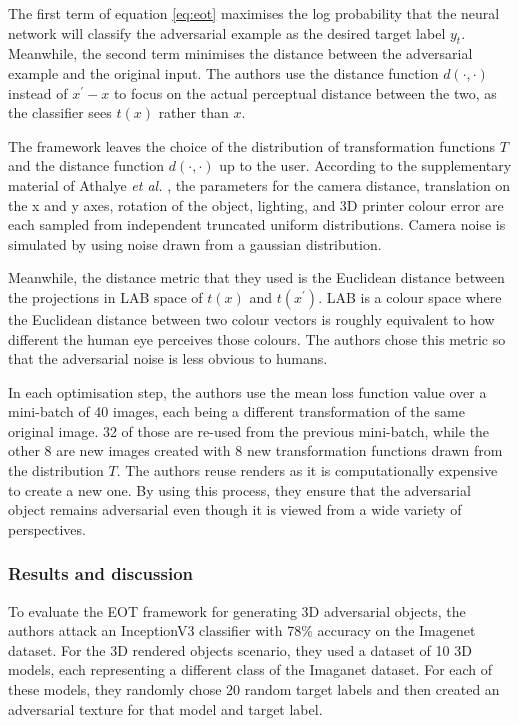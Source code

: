 The first term of equation \ref{eq:eot} maximises the log probability that the neural network will classify the adversarial example as the desired target label $y_{t}$. Meanwhile, the second term minimises the distance between the adversarial example and the original input. The authors use the distance function $d(\cdot, \cdot)$ instead of $x^\prime - x$ to focus on the actual perceptual distance between the two, as the classifier sees $t(x)$ rather than $x$.

The framework leaves the choice of the distribution of transformation functions $T$ and the distance function $d(\cdot, \cdot)$ up to the user. According to the supplementary material of Athalye \textit{et al.} \cite{athalye}, the parameters for the camera distance, translation on the x and y axes, rotation of the object, lighting, and 3D printer colour error are each sampled from independent truncated uniform distributions. Camera noise is simulated by using noise drawn from a gaussian distribution.

Meanwhile, the distance metric that they used is the Euclidean distance between the projections in LAB space of $t(x)$ and $t(x^\prime)$. LAB \cite{lab} is a colour space where the Euclidean distance between two colour vectors is roughly equivalent to how different the human eye perceives those colours. The authors chose this metric so that the adversarial noise is less obvious to humans. 

In each optimisation step, the authors use the mean loss function value over a mini-batch of 40 images, each being a different transformation of the same original image. 32 of those are re-used from the previous mini-batch, while the other 8 are new images created with 8 new transformation functions drawn from the distribution $T$. The authors reuse renders as it is computationally expensive to create a new one. By using this process, they ensure that the adversarial object remains adversarial even though it is viewed from a wide variety of perspectives.

\subsubsection{Results and discussion}
    \label{subsubsec:eot_results}

To evaluate the EOT framework for generating 3D adversarial objects, the authors attack an InceptionV3 classifier \cite{inceptionv3} with 78\% accuracy on the Imagenet dataset. For the 3D rendered objects scenario, they used a dataset of 10 3D models, each representing a different class of the Imaganet dataset. For each of these models, they randomly chose 20 random target labels and then created an adversarial texture for that model and target label. 


